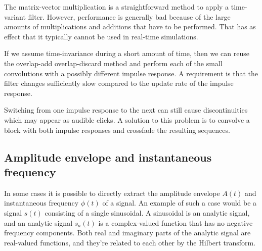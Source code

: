 The matrix-vector multiplication is a straightforward method to apply a
time-variant filter. However, performance is generally bad because of the large
amounts of multiplications and additions that have to be performed. That has as
effect that it typically cannot be used in real-time simulations.

If we assume time-invariance during a short amount of time, then we can reuse
the overlap-add overlap-discard method and perform each of the small convolutions with a
possibly different impulse response. A requirement is that the filter changes
sufficiently slow compared to the update rate of the impulse response.

Switching from one impulse response to the next can still cause discontinuities
which may appear as audible clicks. A solution to this problem is to convolve a block
with both impulse responses and crossfade the resulting sequences.




\subsection{Amplitude envelope and instantaneous frequency}\label{sec:theory:signal:hilbert}
In some cases it is possible to directly extract the amplitude envelope $A(t)$
and instantaneous frequency $\phi(t)$ of a signal. An example of such a case
would be a signal $s(t)$ consisting of a single sinusoidal. A sinusoidal is an
analytic signal, and an analytic signal $s_a(t)$ is a complex-valued function
that has no negative frequency components. Both real and imaginary parts of the
analytic signal are real-valued functions, and they're related to each other by
the Hilbert transform.

